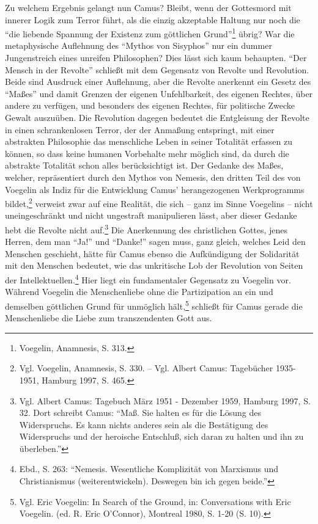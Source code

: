 Zu welchem Ergebnis gelangt nun Camus? Bleibt, wenn der Gottesmord mit
innerer Logik zum Terror führt, als die einzig akzeptable Haltung nur
noch die "`die liebende Spannung der Existenz zum göttlichen
Grund"'\footnote{Voegelin, Anamnesis, S. 313.} übrig? War die
metaphysische Auflehnung des "`Mythos von Sisyphos"' nur ein dummer
Jungenstreich eines unreifen Philosophen? Dies lässt sich kaum behaupten.
"`Der Mensch in der Revolte"' schließt mit dem Gegensatz von Revolte und
Revolution. Beide sind Ausdruck einer Auflehnung, aber die Revolte
anerkennt ein Gesetz des "`Maßes"' und damit Grenzen der eigenen
Unfehlbarkeit, des eigenen Rechtes, über andere zu verfügen, und
besonders des eigenen Rechtes, für politische Zwecke Gewalt auszuüben.
Die Revolution dagegen bedeutet die Entgleisung der Revolte in einen
schrankenlosen Terror, der der Anmaßung entspringt, mit einer abstrakten
Philosophie das menschliche Leben in seiner Totalität erfassen zu
können, so dass keine humanen Vorbehalte mehr möglich sind, da durch die
abstrakte Totalität schon alles berücksichtigt ist. Der Gedanke des
Maßes, welcher, repräsentiert durch den Mythos von Nemesis, den dritten
Teil des von Voegelin als Indiz für die Entwicklung Camus'
herangezogenen Werkprogramms bildet,\footnote{Vgl. Voegelin, Anamnesis,
  S. 330. -- Vgl.  Albert Camus: Tagebücher 1935-1951, Hamburg 1997,
  S. 465.}  verweist zwar auf eine Realität, die sich -- ganz im Sinne
Voegelins -- nicht uneingeschränkt und nicht ungestraft manipulieren
lässt, aber dieser Gedanke hebt die Revolte nicht auf.\footnote{Vgl.
  Albert Camus: Tagebuch März 1951 - Dezember 1959, Hamburg 1997, S. 32.
  Dort schreibt Camus: "`Maß. Sie halten es für die Lösung des
  Widerspruchs. Es kann nichts anderes sein als die Bestätigung des
  Widerspruchs und der heroische Entschluß, sich daran zu halten und ihn
  zu überleben."'} Die Anerkennung des christlichen Gottes, jenes
Herren, dem man "`Ja!"' und "`Danke!"' sagen muss, ganz gleich, welches
Leid den Menschen geschieht, hätte für Camus ebenso die Aufkündigung der
Solidarität mit den Menschen bedeutet, wie das unkritische Lob der
Revolution von Seiten der Intellektuellen.\footnote{Ebd., S. 263:
  "`Nemesis.  Wesentliche Komplizität von Marxismus und Christianismus
  (weiterentwickeln).  Deswegen bin ich gegen beide."'} Hier liegt ein
fundamentaler Gegensatz zu Voegelin vor. Während Voegelin die
Menschenliebe ohne die Partizipation an ein und demselben göttlichen
Grund für unmöglich hält,\footnote{Vgl. Eric Voegelin: In Search of the
  Ground, in: Conversations with Eric Voegelin.  (ed. R. Eric O'Connor),
  Montreal 1980, S. 1-20 (S. 10).} schließt für Camus gerade die
Menschenliebe die Liebe zum transzendenten Gott aus.

